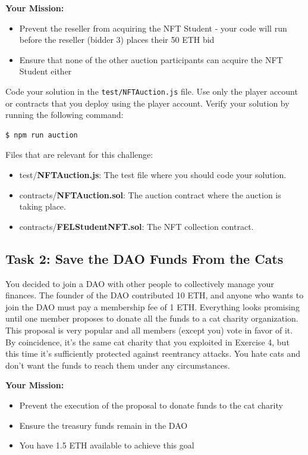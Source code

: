 \documentclass[12pt]{article}
\begin{document}
\medskip
\noindent
\textbf{Your Mission:}
\begin{itemize}
    \item Prevent the reseller from acquiring the NFT Student - your code will run before
          the reseller (bidder 3) places their 50 ETH bid
    \item Ensure that none of the other auction participants can acquire the NFT Student
          either
\end{itemize}

\noindent
Code your solution in the \texttt{test/NFTAuction.js} file. Use only the player account or contracts that you deploy using the player account. Verify your solution by running the following command:

\begin{verbatim}
$ npm run auction
\end{verbatim}

\noindent
Files that are relevant for this challenge:
\begin{itemize}
    \item test/\textbf{NFTAuction.js}: The test file where you should code your solution.
    \item contracts/\textbf{NFTAuction.sol}: The auction contract where the auction is
          taking place.
    \item contracts/\textbf{FELStudentNFT.sol}: The NFT collection contract.
\end{itemize}

\subsection*{Task 2: Save the DAO Funds From the Cats}

You decided to join a DAO with other people to collectively manage your
finances. The founder of the DAO contributed 10 ETH, and anyone who wants to
join the DAO must pay a membership fee of 1 ETH. Everything looks promising
until one member proposes to donate all the funds to a cat charity
organization. This proposal is very popular and all members (except you) vote
in favor of it. By coincidence, it's the same cat charity that you exploited in
Exercise 4, but this time it's sufficiently protected against reentrancy
attacks. You hate cats and don't want the funds to reach them under any
circumstances.

\medskip
\noindent
\textbf{Your Mission:}
\begin{itemize}
    \item Prevent the execution of the proposal to donate funds to the cat charity
    \item Ensure the treasury funds remain in the DAO
    \item You have 1.5 ETH available to achieve this goal
\end{itemize}
\end{document}
